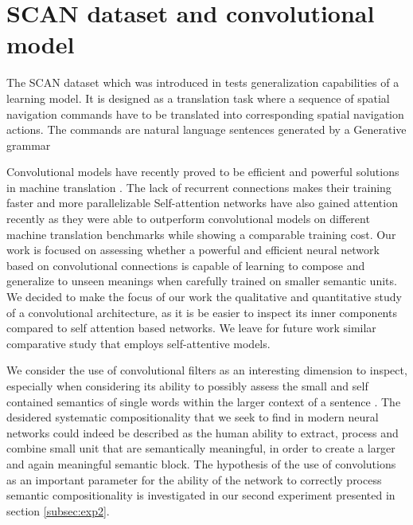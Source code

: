 \section{SCAN dataset and convolutional model}
\label{sec:setup}

The SCAN dataset which was introduced in \cite{Lake:Baroni:2017} tests generalization capabilities of a learning model.
It is designed as a translation task where a sequence of spatial navigation commands have to be translated into corresponding 
spatial navigation actions. The commands are natural language sentences generated by a Generative grammar \rd{\dots}

Convolutional models have recently proved to be efficient and powerful solutions in machine translation 
\cite{kalchbrenner:etal:2016, gehring:etal:2016, gehring:etal:2017}.
The lack of recurrent connections makes their training faster and more parallelizable 
Self-attention networks have also gained attention recently as they were able to outperform convolutional models on different
machine translation benchmarks \cite{vaswani:etal:2017, chen:etal:2018} while showing a comparable training cost.
Our work is focused on assessing whether a powerful and efficient neural network based on convolutional connections
is capable of learning to compose and generalize to unseen meanings when carefully trained on smaller semantic units.
We decided to make the focus of our work the qualitative and quantitative study of a convolutional architecture, as
it is be easier to inspect its inner components compared to self attention based networks.
We leave for future work similar comparative study that employs self-attentive models.

We consider the use of convolutional filters as an interesting dimension to inspect, especially when considering 
its ability to possibly assess the small and self contained semantics of single words within the larger context of a sentence \rd{\dots make a proper example with SCAN]}.
The desidered systematic compositionality that we seek to find in modern neural networks could indeed be described as the
human ability to extract, process and combine small unit that are semantically meaningful, in order to create a larger and again meaningful semantic block.
The hypothesis of the use of convolutions as an important parameter for the ability of the network
to correctly process semantic compositionality is investigated in our second experiment presented in section \ref{subsec:exp2}.

